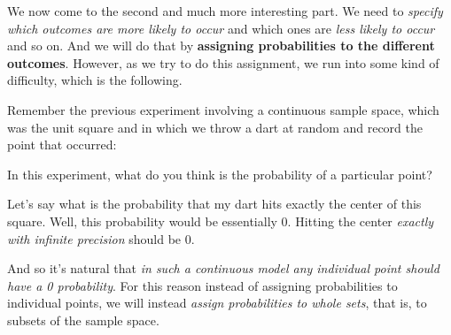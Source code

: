 \documentclass[pdftex, brazil, 12pt, twoside]{article}
\begin{document}
We now come to the second and much more interesting part. We need to \emph{specify which
outcomes are more likely to occur} and which ones are \emph{less likely to occur} and
so on. And we will do that by \textbf{assigning probabilities to the different outcomes}.
However, as we try to do this assignment, we run into some
kind of difficulty, which is the following.

Remember the previous experiment involving a
continuous sample space, which was the unit square and in
which we throw a dart at random and record the point
that occurred:

\begin{figure}[H]
  \begin{center}
  \end{center}
\end{figure}

In this experiment, what do you think is the probability
of a particular point?

Let's say what is the probability that my dart hits
exactly the center of this square.
Well, this probability would be essentially 0.
Hitting the center \emph{exactly with infinite
  precision} should be 0.

And so it's natural that \emph{in such a continuous model any
individual point should have a 0 probability}.
For this reason instead of assigning probabilities to
individual points, we will instead \emph{assign probabilities
  to whole sets}, that is, to subsets of the sample space.

\begin{figure}[H]
  \begin{center}
  \end{center}
\end{figure}
\end{document}
